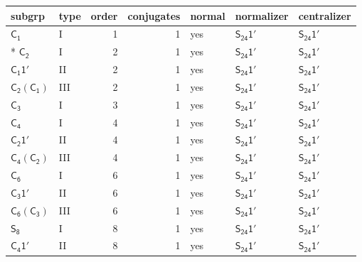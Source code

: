 \documentclass[10pt,a4paper]{article}
\numberwithin{equation}{section}
\newcommand{\grp}[1]{\mathsf{#1}}
\begin{document}
{\small\begin{longtable}{@{}llrrlll@{}}\toprule
subgrp & type & order & conjugates & normal & normalizer & centralizer\\\midrule\endhead
\bottomrule\endfoot\endlastfoot
\href{../../../rotation/data/pdf/C1.pdf}{$\grp{C_{1}}$} & I & 1 & 1 & yes & \href{S24-1p.pdf}{$\grp{S_{24}1'}$} & \href{S24-1p.pdf}{$\grp{S_{24}1'}$}\\*
\href{../../../rotation/data/pdf/C2.pdf}{$\grp{C_{2}}$} & I & 2 & 1 & yes & \href{S24-1p.pdf}{$\grp{S_{24}1'}$} & \href{S24-1p.pdf}{$\grp{S_{24}1'}$}\\
\href{C1-1p.pdf}{$\grp{C_{1}1'}$} & II & 2 & 1 & yes & \href{S24-1p.pdf}{$\grp{S_{24}1'}$} & \href{S24-1p.pdf}{$\grp{S_{24}1'}$}\\
\href{C2-C1.pdf}{$\grp{C_{2}}(\grp{C_{1}})$} & III & 2 & 1 & yes & \href{S24-1p.pdf}{$\grp{S_{24}1'}$} & \href{S24-1p.pdf}{$\grp{S_{24}1'}$}\\
\href{../../../rotation/data/pdf/C3.pdf}{$\grp{C_{3}}$} & I & 3 & 1 & yes & \href{S24-1p.pdf}{$\grp{S_{24}1'}$} & \href{S24-1p.pdf}{$\grp{S_{24}1'}$}\\
\href{../../../rotation/data/pdf/C4.pdf}{$\grp{C_{4}}$} & I & 4 & 1 & yes & \href{S24-1p.pdf}{$\grp{S_{24}1'}$} & \href{S24-1p.pdf}{$\grp{S_{24}1'}$}\\
\href{C2-1p.pdf}{$\grp{C_{2}1'}$} & II & 4 & 1 & yes & \href{S24-1p.pdf}{$\grp{S_{24}1'}$} & \href{S24-1p.pdf}{$\grp{S_{24}1'}$}\\
\href{C4-C2.pdf}{$\grp{C_{4}}(\grp{C_{2}})$} & III & 4 & 1 & yes & \href{S24-1p.pdf}{$\grp{S_{24}1'}$} & \href{S24-1p.pdf}{$\grp{S_{24}1'}$}\\
\href{../../../rotation/data/pdf/C6.pdf}{$\grp{C_{6}}$} & I & 6 & 1 & yes & \href{S24-1p.pdf}{$\grp{S_{24}1'}$} & \href{S24-1p.pdf}{$\grp{S_{24}1'}$}\\
\href{C3-1p.pdf}{$\grp{C_{3}1'}$} & II & 6 & 1 & yes & \href{S24-1p.pdf}{$\grp{S_{24}1'}$} & \href{S24-1p.pdf}{$\grp{S_{24}1'}$}\\
\href{C6-C3.pdf}{$\grp{C_{6}}(\grp{C_{3}})$} & III & 6 & 1 & yes & \href{S24-1p.pdf}{$\grp{S_{24}1'}$} & \href{S24-1p.pdf}{$\grp{S_{24}1'}$}\\
\href{../../../rotation/data/pdf/S8.pdf}{$\grp{S_{8}}$} & I & 8 & 1 & yes & \href{S24-1p.pdf}{$\grp{S_{24}1'}$} & \href{S24-1p.pdf}{$\grp{S_{24}1'}$}\\
\href{C4-1p.pdf}{$\grp{C_{4}1'}$} & II & 8 & 1 & yes & \href{S24-1p.pdf}{$\grp{S_{24}1'}$} & \href{S24-1p.pdf}{$\grp{S_{24}1'}$}\\

\end{longtable}}
\end{document}

